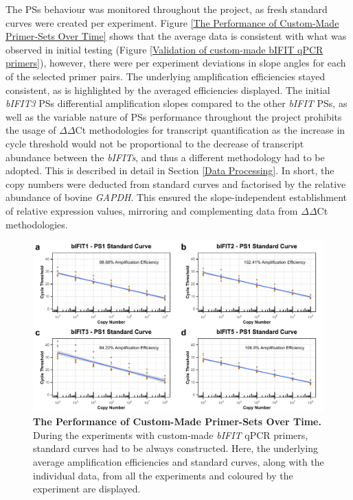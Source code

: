The PSs behaviour was monitored throughout the project, as fresh standard curves were created per experiment. Figure \ref{The Performance of Custom-Made Primer-Sets Over Time} shows that the average data is consistent with what was observed in initial testing (Figure \ref{Validation of custom-made bIFIT qPCR primers}), however, there were per experiment deviations in slope angles for each of the selected primer pairs. The underlying amplification efficiencies stayed consistent, as is highlighted by the averaged efficiencies displayed. The initial \textit{bIFIT3} PSs differential amplification slopes compared to the other \textit{bIFIT} PSs, as well as the variable nature of PSs performance throughout the project prohibits the usage of \(\Delta\)\(\Delta\)Ct methodologies for transcript quantification as the increase in cycle threshold would not be proportional to the decrease of transcript abundance between the \textit{bIFITs}, and thus a different methodology had to be adopted. This is described in detail in Section \ref{Data Processing}. In short, the copy numbers were deducted from standard curves and factorised by the relative abundance of bovine \textit{GAPDH}. This ensured the slope-independent establishment of relative expression values, mirroring and complementing data from \(\Delta\)\(\Delta\)Ct methodologies.

\begin{figure}
    \centering
    \includegraphics[width=1\linewidth]{07. Chapter 2/Figs/01. Technologies/03. standard curves behaviour.pdf}
    \caption[The Performance of Custom-Made Primer-Sets Over Time.]{\textbf{The Performance of Custom-Made Primer-Sets Over Time.} During the experiments with custom-made \textit{bIFIT} qPCR primers, standard curves had to be always constructed. Here, the underlying average amplification efficiencies and standard curves, along with the individual data, from all the experiments and coloured by the experiment are displayed.}
    \label{The Performance of Custom Made Primer Sets Over Time}
\end{figure}

